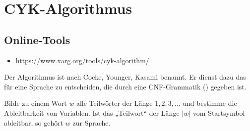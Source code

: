 \documentclass{lehramt-informatik-haupt}
\begin{document}
\chapter{CYK-Algorithmus}

\begin{liQuellen}
\item \cite[Seite 45-75]{theo:fs:2}
\item \cite[Seite 186-188]{hoffmann}
\item \cite{wiki:cyk}
\end{liQuellen}

\section{Online-Tools}

\begin{itemize}
\item \url{https://www.xarg.org/tools/cyk-algorithm/}
\end{itemize}

\noindent
Der Algorithmus ist nach Cocke, Younger, Kasami benannt. Er dienst dazu
das  für eine Sprache zu entscheiden, die durch eine
CNF-Grammatik () gegeben ist.

Bilde zu einem Wort $w$ alle Teilwörter der Länge $1, 2, 3, \dots$ und
bestimme die Ableitbarkeit von Variablen. Ist das „Teilwort“ der Länge
$|w|$ vom Startsymbol ableitbar, so gehört $w$ zur Sprache.


\literatur
\end{document}
